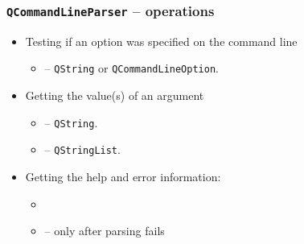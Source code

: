 \begin{frame}[fragile]
  \frametitle{\texttt{QCommandLineParser} -- operations}
  \small
  \begin{itemize}
    \item Testing if an option was specified on the command line
    \begin{itemize}
      \item \verb@isSet@ -- \texttt{QString} or \texttt{QCommandLineOption}.
    \end{itemize}
    \item Getting the value(s) of an argument
    \begin{itemize}
      \item \verb@value@ -- \texttt{QString}.
      \item \verb@values@ -- \texttt{QStringList}.
    \end{itemize}
    \item Getting the help and error information:
    \begin{itemize}
      \item \verb@helpString@
      \item \verb@errorString@ -- only after parsing fails
    \end{itemize}
  \end{itemize}
\end{frame}

